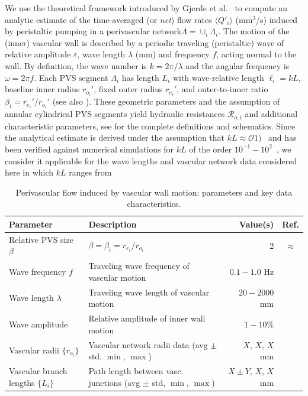 We use the theoretical framework introduced by Gjerde et al.~\cite{gjerde2023directional} to compute an analytic estimate of the time-averaged (or \emph{net}) flow rates $\langle Q'_i \rangle$ (mm$^3$/s) induced by peristaltic pumping in a perivascular network$\Lambda = \cup_i \Lambda_i$. The motion of the (inner) vascular wall is described by a periodic traveling (peristaltic) wave of relative amplitude $\varepsilon$, wave length $\lambda$ (mm) and frequency $f$, acting normal to the wall. By definition, the wave number is $k = 2 \pi/\lambda$ and the angular frequency is $\omega = 2 \pi f$. Each PVS segment $\Lambda_i$ has length $L_i$ with wave-relative length $\ell_i = k L$, baseline inner radius $r_{o_i}'$, fixed outer radius $r_{e_i}'$, and outer-to-inner ratio $\beta_i = r_{e_i}'/r_{o_i}'$ (see also ). These geometric parameters and the assumption of annular cylindrical PVS segments yield hydraulic resistances $\mathcal{R}_{o, i}$ and additional characteristic parameters, see \cite{gjerde2023directional} for the complete definitions and schematics. Since the analytical estimate is derived under the assumption that $k L \approx \mathcal{O} 1)$~\cite{gjerde2023directional} and has been verified against numerical simulations for $k L$ of the order $10^{-1}-10^2$~\cite[Table I]{gjerde2023directional}, we consider it applicable for the wave lengths and vascular network data considered here in which $k L$ ranges from 

\begin{table}
  \small
  \begin{tabular}{llrc}
    \toprule
    Parameter & Description & Value(s)  & Ref.\\ 
    \midrule
    Relative PVS size $\beta$ & $\beta = \beta_i = r_{e_i} / r_{o_i}$ & 2 & $\approx$\cite{eide2024functional} \\
    Wave frequency $f$ & Traveling wave frequency of vascular motion & $0.1-1.0$ Hz & \discuss{\cite{gjerde2023directional}} \\
    Wave length $\lambda$ & Traveling wave length of vascular motion & $20-2000$ mm & \discuss{\cite{broggini2024long, gjerde2023directional}} \\
    Wave amplitude & Relative amplitude of inner wall motion & $1-10\%$ & \discuss{\cite{gjerde2023directional}} \\
    Vascular radii $\{r_{o_i}\}$ & Vascular network radii data (avg $\pm$ std, $\min$, $\max$) & $X$, $X$, $X$  mm & \cite{hodneland2019new} \\
    Vascular branch lengths $\{L_{i}\}$ & Path length between vasc. junctions (avg $\pm$ std, $\min$, $\max$) & $X \pm Y$, $X$, $X$  mm & \discuss{--} \\
    \bottomrule
  \end{tabular}
  \caption{Perivascular flow induced by vascular wall motion: parameters and key data characteristics.}
  \label{tab:pvs:parameters}
\end{table}

